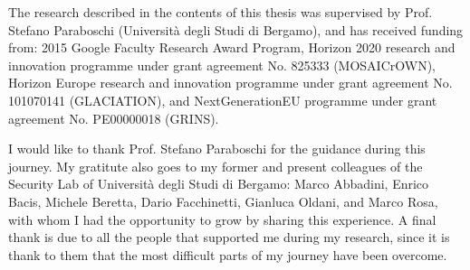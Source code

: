The research described in the contents of this thesis was
supervised by Prof. Stefano Paraboschi (Università degli Studi di
Bergamo), and has received funding from: 2015 Google Faculty Research
Award Program, Horizon 2020 research and innovation programme under
grant agreement No. 825333 (MOSAICrOWN), Horizon Europe research and
innovation programme under grant agreement No. 101070141 (GLACIATION),
and NextGenerationEU programme under grant agreement No. PE00000018
(GRINS).

I would like to thank Prof. Stefano Paraboschi for the guidance during
this journey. My gratitute also goes to my former and present
colleagues of the Security Lab of Università degli Studi di Bergamo:
Marco Abbadini, Enrico Bacis, Michele Beretta, Dario Facchinetti,
Gianluca Oldani, and Marco Rosa, with whom I had the opportunity to
grow by sharing this experience. A final thank is due to all the
people that supported me during my research, since it is thank to them
that the most difficult parts of my journey have been overcome.
